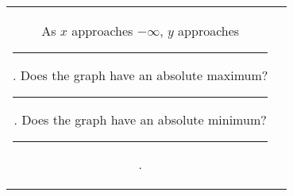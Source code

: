 \documentclass[twoside, 10pt]{article}
\begin{document}
\begin{enumerate}[leftmargin=*]
\begin{center}
\begin{tabular}{cc}
{As $x$ approaches $-\infty$, $y$ approaches \rule{8em}{.1pt}.\\[1em]
Does the graph have an absolute maximum?  \rule{4em}{.1pt}.\\[1em]
Does the graph have an absolute minimum?  \rule{4em}{.1pt}.}
\end{tabular}
\end{center}
\end{enumerate}
\end{document}
